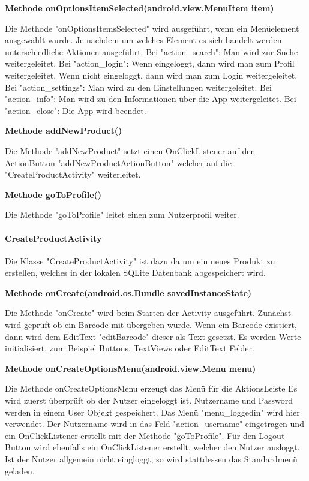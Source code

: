 \documentclass{scrartcl}
\begin{document}
\noindent\textbf{Methode onOptionsItemSelected(android.view.MenuItem item)} 

\noindent Die Methode "onOptionsItemsSelected" wird ausgeführt, wenn ein Menüelement ausgewählt wurde. Je nachdem um welches Element es sich handelt werden unterschiedliche Aktionen ausgeführt. Bei "action\_search": Man wird zur Suche weitergeleitet. Bei "action\_login": Wenn eingeloggt, dann wird man zum Profil weitergeleitet. Wenn nicht eingeloggt, dann wird man zum Login weitergeleitet. Bei "action\_settings": Man wird zu den Einstellungen weitergeleitet. Bei "action\_info": Man wird zu den Informationen über die App weitergeleitet. Bei "action\_close": Die App wird beendet. \newline

\noindent\textbf{Methode addNewProduct()} 

\noindent Die Methode "addNewProduct" setzt einen OnClickListener auf den ActionButton "addNewProductActionButton" welcher auf die "CreateProductActivity" weiterleitet. \newline

\noindent\textbf{Methode goToProfile()} 

\noindent Die Methode "goToProfile" leitet einen zum Nutzerprofil weiter. \newline

\paragraph{CreateProductActivity}

Die Klasse "CreateProductActivity" ist dazu da um ein neues Produkt zu erstellen, welches in der lokalen SQLite Datenbank abgespeichert wird. \newline

\noindent\textbf{Methode onCreate(android.os.Bundle savedInstanceState)} 

\noindent Die Methode "onCreate" wird beim Starten der Activity ausgeführt. Zunächst wird geprüft ob ein Barcode mit übergeben wurde. Wenn ein Barcode existiert, dann wird dem EditText "editBarcode" dieser als Text gesetzt. Es werden Werte initialisiert, zum Beispiel Buttons, TextViews oder EditText Felder. \newline

\noindent\textbf{Methode onCreateOptionsMenu(android.view.Menu menu)} 

\noindent Die Methode onCreateOptionsMenu erzeugt das Menü für die AktionsLeiste Es wird zuerst überprüft ob der Nutzer eingeloggt ist. Nutzername und Password werden in einem User Objekt gespeichert. Das Menü "menu\_loggedin" wird hier verwendet. Der Nutzername wird in das Feld "action\_username" eingetragen und ein OnClickListener erstellt mit der Methode "goToProfile". Für den Logout Button wird ebenfalls ein OnClickListener erstellt, welcher den Nutzer ausloggt. Ist der Nutzer allgemein nicht eingloggt, so wird stattdessen das Standardmenü geladen. \newline
\end{document}
